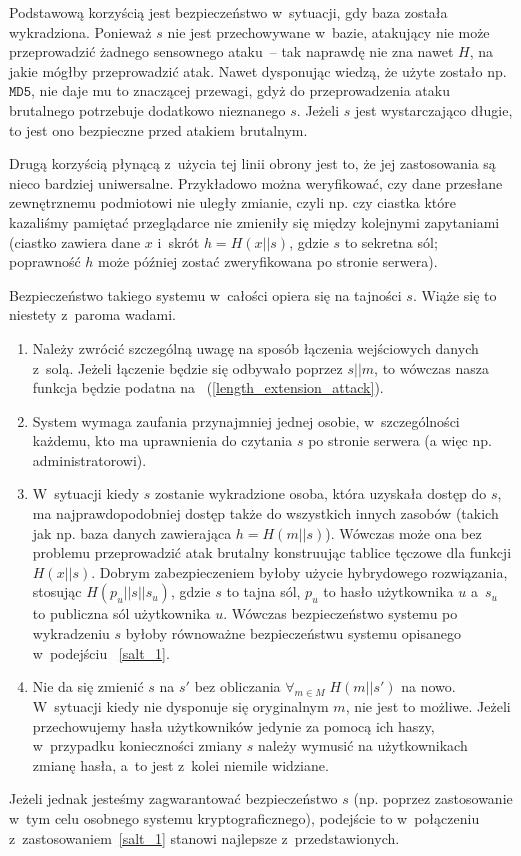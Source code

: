 Podstawową korzyścią jest bezpieczeństwo w~sytuacji, gdy baza została
wykradziona. Ponieważ $s$ nie jest przechowywane w~bazie, atakujący nie może
przeprowadzić żadnego sensownego ataku~-- tak naprawdę nie zna nawet $H$, na
jakie mógłby przeprowadzić atak. Nawet dysponując wiedzą, że użyte zostało np.
$\texttt{MD5}$, nie daje mu to znaczącej przewagi, gdyż do przeprowadzenia
ataku brutalnego potrzebuje dodatkowo nieznanego $s$. Jeżeli $s$ jest
wystarczająco długie, to jest ono bezpieczne przed atakiem brutalnym.

Drugą korzyścią płynącą z~użycia tej linii obrony jest to, że jej zastosowania
są nieco bardziej uniwersalne. Przykładowo można weryfikować, czy dane
przesłane zewnętrznemu podmiotowi nie uległy zmianie, czyli np. czy ciastka
które kazaliśmy pamiętać przeglądarce nie zmieniły się między kolejnymi
zapytaniami (ciastko zawiera dane $x$ i~skrót $h = H(x||s)$, gdzie $s$ to
sekretna sól; poprawność $h$ może później zostać zweryfikowana po stronie
serwera).

Bezpieczeństwo takiego systemu w~całości opiera się na tajności $s$. Wiąże się
to niestety z~paroma wadami.
\begin{enumerate}

\item Należy zwrócić szczególną uwagę na sposób łączenia wejściowych danych
z~solą. Jeżeli łączenie będzie się odbywało poprzez $s||m$, to wówczas nasza
funkcja będzie podatna na ~(\ref{length_extension_attack}).

\item System wymaga zaufania przynajmniej jednej osobie, w~szczególności
każdemu, kto ma uprawnienia do czytania $s$ po stronie serwera (a więc np.
administratorowi).

\item W~sytuacji kiedy $s$ zostanie wykradzione osoba, która uzyskała dostęp do
$s$, ma najprawdopodobniej dostęp także do wszystkich innych zasobów (takich
jak np. baza danych zawierająca $h=H(m||s)$). Wówczas może ona bez problemu
przeprowadzić atak brutalny konstruując tablice tęczowe dla funkcji $H(x||s)$.
Dobrym zabezpieczeniem byłoby użycie hybrydowego rozwiązania, stosując
$H(p_u||s||s_u)$, gdzie $s$ to tajna sól, $p_u$ to hasło użytkownika $u$
a~$s_u$ to publiczna sól użytkownika $u$. Wówczas bezpieczeństwo systemu po
wykradzeniu $s$ byłoby równoważne bezpieczeństwu systemu opisanego w~podejściu
~\ref{salt_1}.

\item Nie da się zmienić $s$ na $s'$ bez obliczania $\forall_{m \in M} \;
H(m||s')$ na nowo. W~sytuacji kiedy nie dysponuje się oryginalnym $m$, nie jest
to możliwe. Jeżeli przechowujemy hasła użytkowników jedynie za pomocą ich
haszy, w~przypadku konieczności zmiany $s$ należy wymusić na użytkownikach
zmianę hasła, a~to jest z~kolei niemile widziane.

\end{enumerate}
Jeżeli jednak jesteśmy zagwarantować bezpieczeństwo $s$ (np. poprzez
zastosowanie w~tym celu osobnego systemu kryptograficznego), podejście to
w~połączeniu z~zastosowaniem~\ref{salt_1} stanowi najlepsze z~przedstawionych.
